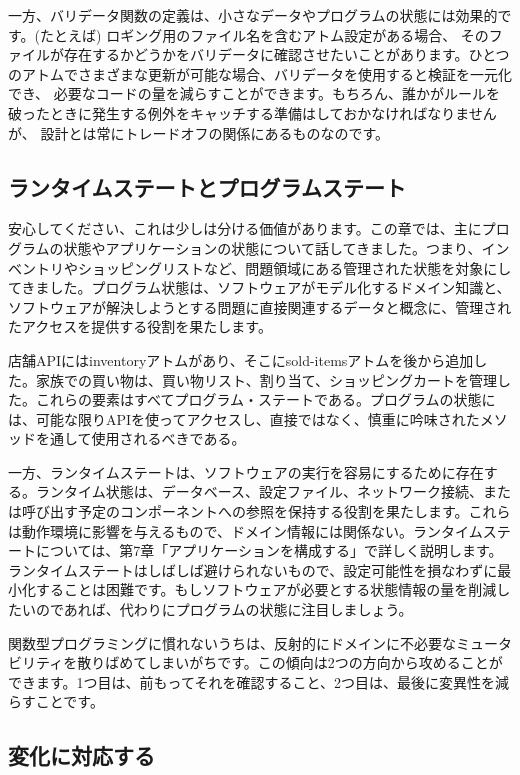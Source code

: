 一方、バリデータ関数の定義は、小さなデータやプログラムの状態には効果的です。(たとえば) ロギング用のファイル名を含むアトム設定がある場合、 そのファイルが存在するかどうかをバリデータに確認させたいことがあります。ひとつのアトムでさまざまな更新が可能な場合、バリデータを使用すると検証を一元化でき、 必要なコードの量を減らすことができます。もちろん、誰かがルールを破ったときに発生する例外をキャッチする準備はしておかなければなりませんが、 設計とは常にトレードオフの関係にあるものなのです。

\subsection{ランタイムステートとプログラムステート}

安心してください、これは少しは分ける価値があります。この章では、主にプログラムの状態やアプリケーションの状態について話してきました。つまり、インベントリやショッピングリストなど、問題領域にある管理された状態を対象にしてきました。プログラム状態は、ソフトウェアがモデル化するドメイン知識と、ソフトウェアが解決しようとする問題に直接関連するデータと概念に、管理されたアクセスを提供する役割を果たします。

店舗APIにはinventoryアトムがあり、そこにsold-itemsアトムを後から追加した。家族での買い物は、買い物リスト、割り当て、ショッピングカートを管理した。これらの要素はすべてプログラム・ステートである。プログラムの状態には、可能な限りAPIを使ってアクセスし、直接ではなく、慎重に吟味されたメソッドを通して使用されるべきである。

一方、ランタイムステートは、ソフトウェアの実行を容易にするために存在する。ランタイム状態は、データベース、設定ファイル、ネットワーク接続、または呼び出す予定のコンポーネントへの参照を保持する役割を果たします。これらは動作環境に影響を与えるもので、ドメイン情報には関係ない。ランタイムステートについては、第7章「アプリケーションを構成する」で詳しく説明します。ランタイムステートはしばしば避けられないもので、設定可能性を損なわずに最小化することは困難です。もしソフトウェアが必要とする状態情報の量を削減したいのであれば、代わりにプログラムの状態に注目しましょう。

関数型プログラミングに慣れないうちは、反射的にドメインに不必要なミュータビリティを散りばめてしまいがちです。この傾向は2つの方向から攻めることができます。1つ目は、前もってそれを確認すること、2つ目は、最後に変異性を減らすことです。


\subsection{変化に対応する}

